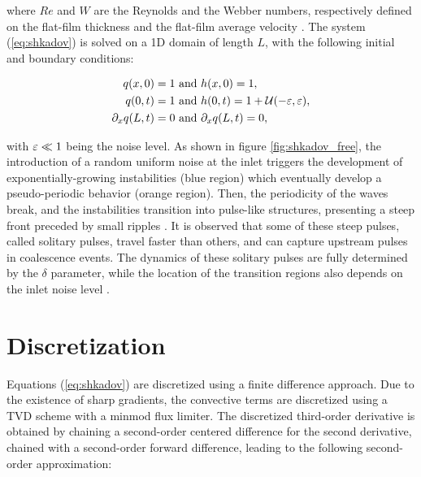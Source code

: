 \noindent where $Re$ and $W$ are the Reynolds and the Webber numbers, respectively defined on the flat-film thickness and the flat-film average velocity \cite{chang2002}. The system (\ref{eq:shkadov}) is solved on a 1D domain of length $L$, with the following initial and boundary conditions:

\begin{equation}
\label{eq:shkadov_bc}
\begin{split}
	q(x,0)		= 1 &\text{ and } h(x,0)	= 1, \\
	q(0,t) 		= 1 &\text{ and } h(0,t) 	= 1 + \mathcal{U} ( -\varepsilon, \varepsilon), \\
	\partial_x q(L,t) = 0 &\text{ and } 	\partial_x q(L,t) = 0,
\end{split}
\end{equation}

with $\varepsilon \ll 1$ being the noise level. As shown in figure \ref{fig:shkadov_free}, the introduction of a random uniform noise at the inlet triggers the development of exponentially-growing instabilities (blue region) which eventually develop a pseudo-periodic behavior (orange region). Then, the periodicity of the waves break, and the instabilities transition into pulse-like structures, presenting a steep front preceded by small ripples \cite{chang2002book}. It is observed that some of these steep pulses, called solitary pulses, travel faster than others, and can capture upstream pulses in coalescence events. The dynamics of these solitary pulses are fully determined by the $\delta$ parameter, while the location of the transition regions also depends on the inlet noise level \cite{chang2002}.



\section{Discretization}

Equations (\ref{eq:shkadov}) are discretized using a finite difference approach. Due to the existence of sharp gradients, the convective terms are discretized using a TVD scheme with a minmod flux limiter. The discretized third-order derivative is obtained by chaining a second-order centered difference for the second derivative, chained with a second-order forward difference, leading to the following second-order approximation:

